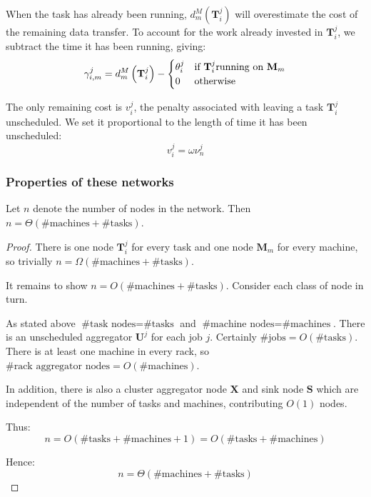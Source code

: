When the task has already been running, $d^M_m\left(\mathbf{T}_{i}^{j}\right)$ will overestimate the cost of the remaining data transfer. To account for the work already invested in $\mathbf{T}_{i}^{j}$, we subtract the time it has been running, giving:
\[\gamma_{i,m}^{j} = d_{m}^{M}\left(\mathbf{T}_{i}^{j}\right)-\begin{cases}
\theta_{i}^{j} & \text{if \ensuremath{\mathbf{T}_{i}^{j}}running on \ensuremath{\mathbf{M}_{m}}}\\
0 & \text{otherwise}
\end{cases}\]

The only remaining cost is $v_i^j$, the penalty associated with leaving a task $\mathbf{T}_{i}^{j}$ unscheduled. We set it proportional to the length of time it has been unscheduled:
\[v_i^j = \omega\nu_{n}^{j}\]

\subsubsection{Properties of these networks}

\begin{lemma} \label{lemma:network-num-nodes}
Let $n$ denote the number of nodes in the network. Then $n = \Theta\left(\text{\# machines} + \text{\# tasks}\right)$.
\end{lemma}
\begin{proof}
There is one node $\mathbf{T}_i^j$ for every task and one node $\mathbf{M}_m$ for every machine, so trivially $n = \Omega\left(\text{\# machines} + \text{\# tasks}\right)$.

It remains to show $n = O\left(\text{\# machines} + \text{\# tasks}\right)$. Consider each class of node in turn.

As stated above $\text{\# task nodes} = \text{\# tasks}$ and $\text{\# machine nodes} = \text{\# machines}$. There is an unscheduled aggregator $\mathbf{U}^j$ for each job $j$. Certainly $\text{\# jobs} = O\left(\text{\# tasks}\right)$. There is at least one machine in every rack, so $\text{\# rack aggregator nodes} = O\left(\text{\# machines}\right)$. 

In addition, there is also a cluster aggregator node $\mathbf{X}$ and sink node $\mathbf{S}$ which are independent of the number of tasks and machines, contributing $O(1)$ nodes.

Thus:
\[n = O\left(\text{\# tasks} + \text{\# machines} + 1\right) = O\left(\text{\# tasks} + \text{\# machines}\right)\]

Hence:
\[n = \Theta\left(\text{\# machines} + \text{\# tasks}\right)\]
\end{proof}

